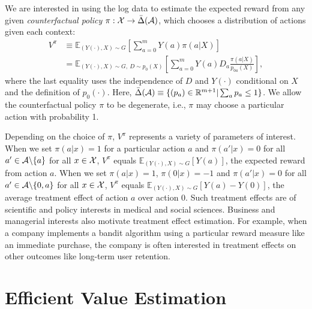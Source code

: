 \documentclass[letterpaper]{article} \usepackage{aaai19}  \usepackage{times}  \usepackage{helvet}  \usepackage{courier}  \usepackage{url}  \usepackage{graphicx}  \frenchspacing  \usepackage{comment}
\begin{document}
We are interested in using the log data to estimate the expected reward from any given {\it counterfactual policy} $\pi:{\cal X}\rightarrow \bar{\Delta}({\cal A})$, which chooses a distribution of actions given each context:
\begin{align}\label{eq:V^pi}
V^{\pi}&\equiv \mathbb{E}_{(Y(\cdot),X)\sim G}[\sum_{a=0}^mY(a)\pi(a|X)]\nonumber\\
&= \mathbb{E}_{(Y(\cdot),X)\sim G, ~D\sim p_0(X)}[\sum_{a=0}^m Y(a)D_{a}\frac{\pi(a|X)}{p_{0a}(X)}],
\end{align}
where the last equality uses the independence of $D$ and $Y(\cdot)$ conditional on $X$ and the definition of $p_0(\cdot)$.
Here, $\bar{\Delta}({\cal A})\equiv\{(p_a)\in\mathbb{R}^{m+1}| \sum_a p_a\leq 1\}$. 
We allow the counterfactual policy $\pi$ to be degenerate, i.e., $\pi$ may choose a particular action with probability 1. 

Depending on the choice of $\pi$, $V^\pi$ represents a variety of parameters of interest.
When we set $\pi(a|x)=1$ for a particular action $a$ and $\pi(a'|x)=0$ for all $a'\in {\cal A}\backslash\{a\}$ for all $x\in{\cal X}$, $V^\pi$ equals $\mathbb{E}_{(Y(\cdot),X)\sim G}[Y(a)]$, the expected reward from action $a$.
When we set $\pi(a|x)=1$, $\pi(0|x)=-1$ and $\pi(a'|x)=0$ for all $a'\in {\cal A}\backslash\{0,a\}$ for all $x\in{\cal X}$, $V^\pi$ equals $\mathbb{E}_{(Y(\cdot),X)\sim G}[Y(a)-Y(0)]$, the average treatment effect of action $a$ over action $0$.
Such treatment effects are of scientific and policy interests in medical and social sciences.  
Business and managerial interests also motivate treatment effect estimation. 
For example, when a company implements a bandit algorithm using a particular reward measure like an immediate purchase, the company is often interested in treatment effects on other outcomes like long-term user retention.


\section{Efficient Value Estimation}\label{estimation}
\end{document}
